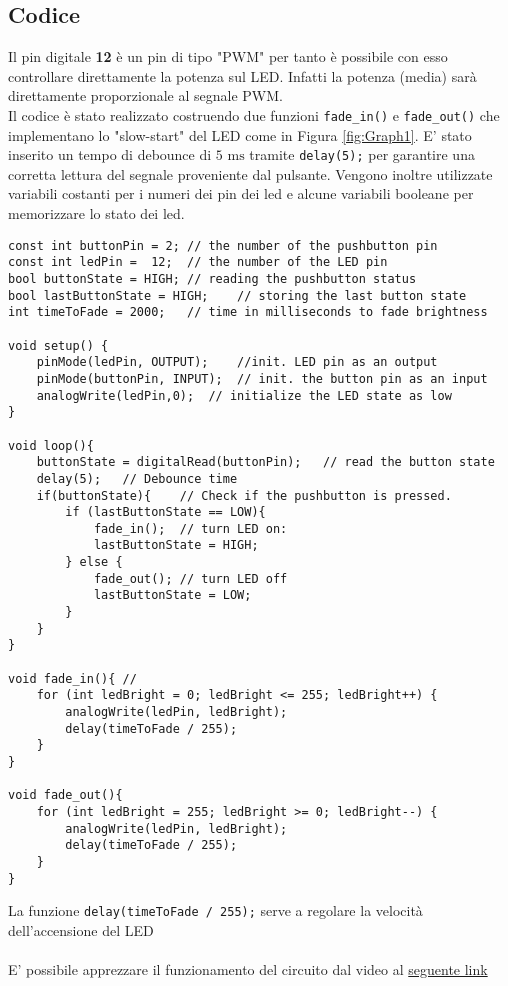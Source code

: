 \subsection{Codice}
Il pin digitale \textbf{12} è un pin di tipo "PWM" per tanto è possibile con esso controllare direttamente la potenza sul LED. Infatti la potenza (media) sarà direttamente proporzionale al segnale PWM.\\
Il codice è stato realizzato costruendo due funzioni \texttt{fade\_in()} e \texttt{fade\_out()} che implementano lo "slow-start" del LED come in Figura \ref{fig:Graph1}. E' stato inserito un tempo di debounce di $5\text{ ms}$ tramite \texttt{delay(5);} per garantire una corretta lettura del segnale proveniente dal pulsante. Vengono inoltre utilizzate variabili costanti per i numeri dei pin dei led e alcune variabili booleane per memorizzare lo stato dei led. 
\begin{lstlisting}[frame=single, language=Arduino]
const int buttonPin = 2; // the number of the pushbutton pin
const int ledPin =  12;  // the number of the LED pin
bool buttonState = HIGH; // reading the pushbutton status
bool lastButtonState = HIGH;    // storing the last button state
int timeToFade = 2000;   // time in milliseconds to fade brightness

void setup() {
    pinMode(ledPin, OUTPUT);    //init. LED pin as an output
    pinMode(buttonPin, INPUT);  // init. the button pin as an input
    analogWrite(ledPin,0);  // initialize the LED state as low
}

void loop(){
    buttonState = digitalRead(buttonPin);   // read the button state
    delay(5);   // Debounce time
    if(buttonState){    // Check if the pushbutton is pressed.
        if (lastButtonState == LOW){
            fade_in();  // turn LED on:
            lastButtonState = HIGH;
        } else {
            fade_out(); // turn LED off
            lastButtonState = LOW;
        }
    }
}

void fade_in(){ // 
    for (int ledBright = 0; ledBright <= 255; ledBright++) {
        analogWrite(ledPin, ledBright);
        delay(timeToFade / 255);
    }
}

void fade_out(){
    for (int ledBright = 255; ledBright >= 0; ledBright--) {
        analogWrite(ledPin, ledBright);
        delay(timeToFade / 255);
    }
}
\end{lstlisting}
La funzione \texttt{delay(timeToFade / 255);} serve a regolare la velocità dell'accensione del LED\\\\
E' possibile apprezzare il funzionamento del circuito dal video al \href{https://mediaspace.unipd.it/media/Esperimento+1/1_9uu86mks}{seguente link}